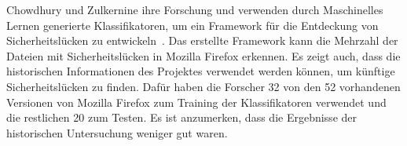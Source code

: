 Chowdhury und Zulkernine ihre Forschung und verwenden durch Maschinelles Lernen generierte Klassifikatoren, um ein Framework für die Entdeckung von Sicherheitslücken zu entwickeln~\cite{chowdhury_zulkernine_2009,chowdhury_zulkernine_2010}.
Das erstellte Framework kann die Mehrzahl der Dateien mit Sicherheitslücken in Mozilla Firefox erkennen.
Es zeigt auch, dass die historischen Informationen des Projektes verwendet werden können, um künftige Sicherheitslücken zu finden.
Dafür haben die Forscher 32 von den 52 vorhandenen Versionen von Mozilla Firefox zum Training der Klassifikatoren verwendet und die restlichen 20 zum Testen.
Es ist anzumerken, dass die Ergebnisse der historischen Untersuchung weniger gut waren.
